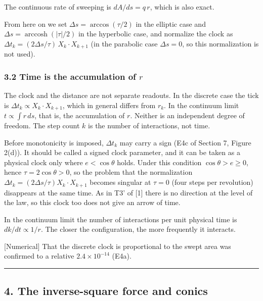 \documentclass[
  a4paper,
]{article}
\begin{document}
The continuous rate of sweeping is \(dA/ds=q\,r\), which is also exact.

From here on we set \(\Delta s=\arccos(\tau/2)\) in the elliptic case
and \(\Delta s=\operatorname{arccosh}(|\tau|/2)\) in the hyperbolic
case, and normalize the clock as
\(\Delta t_k=(2\Delta s/\tau)\,X_k\cdot X_{k+1}\) (in the parabolic case
\(\Delta s=0\), so this normalization is not used).

\subsubsection{\texorpdfstring{3.2 Time is the accumulation of
\(r\)}{3.2 Time is the accumulation of r}}\label{time-is-the-accumulation-of-r}

The clock and the distance are not separate readouts. In the discrete
case the tick is \(\Delta t_k\propto X_k\cdot X_{k+1}\), which in
general differs from \(r_k\). In the continuum limit
\(t\propto\int r\,ds\), that is, the accumulation of \(r\). Neither is
an independent degree of freedom. The step count \(k\) is the number of
interactions, not time.

Before monotonicity is imposed, \(\Delta t_k\) may carry a sign (E4c of
Section 7, Figure 2(d)). It should be called a signed clock parameter,
and it can be taken as a physical clock only where \(e<\cos\theta\)
holds. Under this condition \(\cos\theta>e\ge0\), hence
\(\tau=2\cos\theta>0\), so the problem that the normalization
\(\Delta t_k=(2\Delta s/\tau)X_k\cdot X_{k+1}\) becomes singular at
\(\tau=0\) (four steps per revolution) disappears at the same time. As
in T3' of {[}1{]} there is no direction at the level of the law, so this
clock too does not give an arrow of time.

In the continuum limit the number of interactions per unit physical time
is \(dk/dt\propto1/r\). The closer the configuration, the more
frequently it interacts.

{[}Numerical{]} That the discrete clock is proportional to the swept
area was confirmed to a relative \(2.4\times10^{-14}\) (E4a).

\begin{center}\rule{0.5\linewidth}{0.5pt}\end{center}

\subsection{4. The inverse-square force and
conics}\label{the-inverse-square-force-and-conics}
\end{document}

